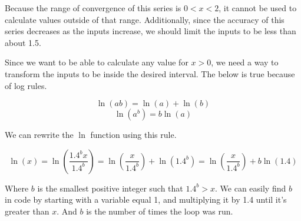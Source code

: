 \documentclass[12pt, letterpaper]{article}
\begin{document}
Because the range of convergence of this series is $0<x<2$, it cannot be used to calculate values outside of that range. Additionally, since the accuracy of this series decreases as the inputs increase, we should limit the inputs to be less than about 1.5.

\begin{center}
\end{center}

Since we want to be able to calculate any value for $x>0$, we need a way to transform the inputs to be inside the desired interval. The below is true because of log rules.

\[ \ln(ab) = \ln(a) + \ln(b) \]
\[ \ln(a^b) = b\ln(a) \]

We can rewrite the $\ln$ function using this rule.

\[ \ln(x) = \ln\left(\frac{1.4^bx}{1.4^b}\right) = \ln\left(\frac{x}{1.4^b}\right) + \ln\left(1.4^b\right) = \ln\left(\frac{x}{1.4^b}\right) + b\ln\left(1.4\right) \]

Where $b$ is the smallest positive integer such that $1.4^b>x$. We can easily find $b$ in code by starting with a variable equal 1, and multiplying it by 1.4 until it's greater than $x$. And $b$ is the number of times the loop was run.

\end{document}
